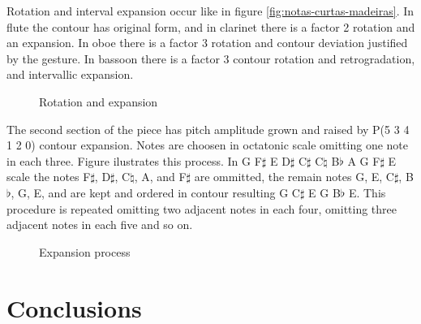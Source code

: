 Rotation and interval expansion occur like in figure
\ref{fig:notas-curtas-madeiras}. In flute the contour has original
form, and in clarinet there is a factor 2 rotation and an
expansion. In oboe there is a factor 3 rotation and contour deviation
justified by the gesture. In bassoon there is a factor 3 contour
rotation and retrogradation, and intervallic expansion.

\begin{figure}[!p]
  \centering

  \subfloat[original]{
    \texttt{[image: c-534120]}
    \label{fig:rot-0}
  }
  \subfloat[rot 2]{
    \texttt{[image: c-412053]}
    \label{fig:rot-2}
  }
  \subfloat[rot 3]{
    \texttt{[image: c-120534]}
    \label{fig:rot-3}
  }
  \caption{Rotation and expansion}
  \label{fig:rotacao-expansao}
\end{figure}

The second section of the piece has pitch amplitude grown and raised
by P(5 3 4 1 2 0) contour expansion. Notes are choosen in octatonic
scale omitting one note in each three. Figure ilustrates this
process. In G F$\sharp$ E D$\sharp$ C$\sharp$ C$\natural$ B$\flat$ A G
F$\sharp$ E scale the notes F$\sharp$, D$\sharp$, C$\natural$, A, and
F$\sharp$ are ommitted, the remain notes G, E, C$\sharp$, B$\flat$, G,
E, and are kept and ordered in contour resulting G C$\sharp$ E G
B$\flat$ E. This procedure is repeated omitting two adjacent notes in
each four, omitting three adjacent notes in each five and so on.

\begin{figure}[!p]
  \centering

  \caption{Expansion process}
\end{figure}

\section{Conclusions}
\label{sec:conclusions}

